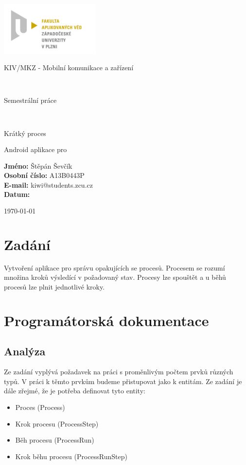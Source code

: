 \documentclass[12pt,a4paper]{article}
\author{Jan Šmejkal}
\let\oldsection\section
\renewcommand\section{\clearpage\oldsection}
\begin{document}
\begin{titlepage}

\includegraphics[width=50mm]{img/FAV.jpg}
\\[160 pt]
\centerline{ \Huge \sc KIV/MKZ - Mobilní komunikace a zařízení}
\\[6 pt]
\centerline{ \LARGE \sc Semestrální práce}
\\[12 pt]
\centerline{ \large \sc Krátký proces}
\centerline{ \large \sc Android aplikace pro}


{
\vfill 
\parindent=0cm
\textbf{Jméno:} Štěpán Ševčík\\
\textbf{Osobní číslo:} A13B0443P\\
\textbf{E-mail:} kiwi@students.zcu.cz\\
\textbf{Datum:} {\large \today\par} %

}

\end{titlepage}


\newpage
\setcounter{page}{2}
\setcounter{tocdepth}{3}
\tableofcontents



\section{Zadání}
Vytvoření aplikace pro správu opakujících se procesů. Procesem se rozumí množina kroků výsledící v požadovaný stav. Procesy lze spouštět a u běhů procesů lze plnit jednotlivé kroky.

\section{Programátorská dokumentace}
\subsection{Analýza}
Ze zadání vyplývá požadavek na práci s proměnlivým počtem prvků různých typů. V práci k těmto prvkům budeme přistupovat jako k entitám. Ze zadání je dále zřejmé, že je potřeba definovat tyto entity:
\begin{itemize}
\item Proces (Process)
\item Krok procesu (ProcessStep)
\item Běh procesu (ProcessRun)
\item Krok běhu procesu (ProcessRunStep)
\end{itemize}
\end{document}
